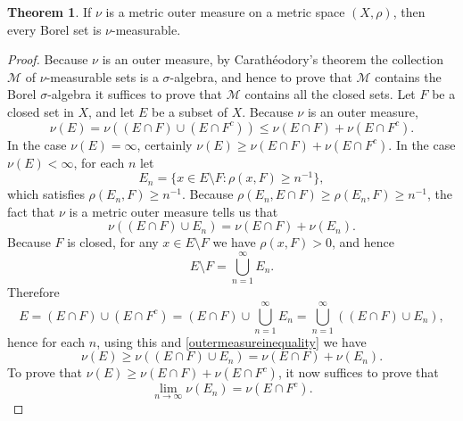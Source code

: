 \documentclass{article}
\theoremstyle{definition}
\newtheorem{theorem}{Theorem}
\theoremstyle{definition}
\begin{document}
\begin{theorem}
If $\nu$ is a metric outer measure on a metric space $(X,\rho)$, then every Borel set is $\nu$-measurable.
\label{sigmaalgebra}
\end{theorem}
\begin{proof}
Because $\nu$ is an outer measure, by Carath\'eodory's theorem the collection $\mathscr{M}$ of $\nu$-measurable sets is a $\sigma$-algebra, and hence
to prove that $\mathscr{M}$ contains the Borel $\sigma$-algebra it suffices to prove that $\mathscr{M}$
contains all the closed sets.
Let $F$ be a closed set in $X$, and let $E$ be a subset of $X$. Because $\nu$ is an outer measure, 
\[
\nu(E) = \nu((E \cap F) \cup (E \cap F^c)) \leq \nu(E \cap F) + \nu(E \cap F^c).
\]
In the case $\nu(E) = \infty$, certainly $\nu(E) \geq  \nu(E \cap F) + \nu(E \cap F^c)$. In the case $\nu(E) < \infty$, 
for each $n$ let 
\[
E_n = \{x \in E \setminus F : \rho(x,F) \geq n^{-1} \},
\]
which satisfies
$\rho(E_n,F) \geq n^{-1}$.
Because $\rho(E_n,E \cap F) \geq \rho(E_n,F) \geq n^{-1}$, the fact that $\nu$ is a metric outer measure tells us that
\begin{equation}
\nu((E \cap F) \cup E_n) = \nu(E\cap F) + \nu(E_n).
\label{outermeasureinequality}
\end{equation}
Because $F$ is closed, for any $x \in E \setminus F$ we have $\rho(x,F)>0$, and hence
\begin{equation}
E \setminus F = \bigcup_{n=1}^\infty E_n.
\label{union}
\end{equation}
Therefore
\[
E = (E \cap F) \cup (E \cap F^c) = (E \cap F) \cup  \bigcup_{n=1}^\infty E_n = \bigcup_{n=1}^\infty ((E \cap F) \cup E_n),
\]
hence for each $n$, using this and \eqref{outermeasureinequality} we have
\[
\nu(E) \geq \nu((E \cap F) \cup E_n)  =   \nu(E\cap F) + \nu(E_n).
\]
To prove that $\nu(E) \geq \nu(E \cap F) + \nu(E \cap F^c)$, it now suffices to prove that
\[
\lim_{n \to \infty} \nu(E_n) = \nu(E \cap F^c).
\] 


\end{proof}
\end{document}
